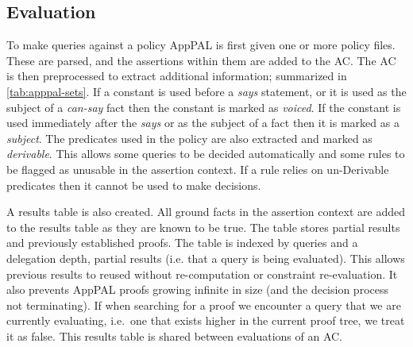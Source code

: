\documentclass[thesis.tex]{subfiles}
\begin{document}
\subsection{Evaluation}
\label{ssec:evaluation-alg}

To make queries against a policy AppPAL is first given one or more policy files.
These are parsed, and the assertions within them are added to the \ac{AC}.
The AC is then preprocessed to extract additional information; summarized in \autoref{tab:apppal-sets}.
If a constant is used before a \emph{says} statement, or it is used as the subject of a \emph{can-say} fact then the constant is marked as \emph{voiced}.
If the constant is used immediately after the \emph{says} or as the subject of a fact then it is marked as a \emph{subject}.
The predicates used in the policy are also extracted and marked as \emph{derivable}.
This allows some queries to be decided automatically and some rules to be flagged as unusable in the assertion context.
If a rule relies on un-Derivable predicates then it cannot be used to make decisions.

A results table is also created.
All ground facts in the assertion context are added to the results table as they are known to be true.
The table stores partial results and previously established proofs.
The table is indexed by queries and a delegation depth, partial results (i.e. that a query is being evaluated).
This allows previous results to reused without re-computation or constraint re-evaluation.
It also prevents AppPAL proofs growing infinite in size (and the decision process not terminating).
If when searching for a proof we encounter a query that we are currently evaluating, i.e.~one that exists higher in the current proof tree, we treat it as false. 
This results table is shared between evaluations of an \ac{AC}.
\end{document}
